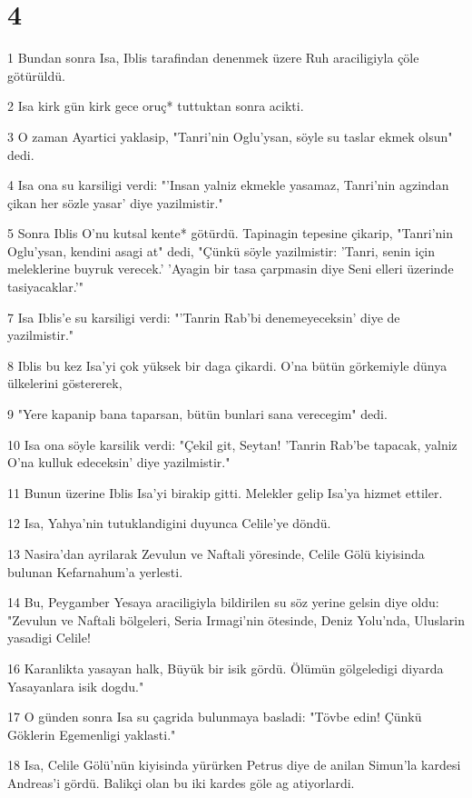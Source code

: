 \chapter{4}

\par 1 Bundan sonra Isa, Iblis tarafindan denenmek üzere Ruh araciligiyla çöle götürüldü.
\par 2 Isa kirk gün kirk gece oruç* tuttuktan sonra acikti.
\par 3 O zaman Ayartici yaklasip, "Tanri'nin Oglu'ysan, söyle su taslar ekmek olsun" dedi.
\par 4 Isa ona su karsiligi verdi: "'Insan yalniz ekmekle yasamaz, Tanri'nin agzindan çikan her sözle yasar' diye yazilmistir."
\par 5 Sonra Iblis O'nu kutsal kente* götürdü. Tapinagin tepesine çikarip, "Tanri'nin Oglu'ysan, kendini asagi at" dedi, "Çünkü söyle yazilmistir: 'Tanri, senin için meleklerine buyruk verecek.' 'Ayagin bir tasa çarpmasin diye Seni elleri üzerinde tasiyacaklar.'"
\par 7 Isa Iblis'e su karsiligi verdi: "'Tanrin Rab'bi denemeyeceksin' diye de yazilmistir."
\par 8 Iblis bu kez Isa'yi çok yüksek bir daga çikardi. O'na bütün görkemiyle dünya ülkelerini göstererek,
\par 9 "Yere kapanip bana taparsan, bütün bunlari sana verecegim" dedi.
\par 10 Isa ona söyle karsilik verdi: "Çekil git, Seytan! 'Tanrin Rab'be tapacak, yalniz O'na kulluk edeceksin' diye yazilmistir."
\par 11 Bunun üzerine Iblis Isa'yi birakip gitti. Melekler gelip Isa'ya hizmet ettiler.
\par 12 Isa, Yahya'nin tutuklandigini duyunca Celile'ye döndü.
\par 13 Nasira'dan ayrilarak Zevulun ve Naftali yöresinde, Celile Gölü kiyisinda bulunan Kefarnahum'a yerlesti.
\par 14 Bu, Peygamber Yesaya araciligiyla bildirilen su söz yerine gelsin diye oldu: "Zevulun ve Naftali bölgeleri, Seria Irmagi'nin ötesinde, Deniz Yolu'nda, Uluslarin yasadigi Celile!
\par 16 Karanlikta yasayan halk, Büyük bir isik gördü. Ölümün gölgeledigi diyarda Yasayanlara isik dogdu."
\par 17 O günden sonra Isa su çagrida bulunmaya basladi: "Tövbe edin! Çünkü Göklerin Egemenligi yaklasti."
\par 18 Isa, Celile Gölü'nün kiyisinda yürürken Petrus diye de anilan Simun'la kardesi Andreas'i gördü. Balikçi olan bu iki kardes göle ag atiyorlardi.
